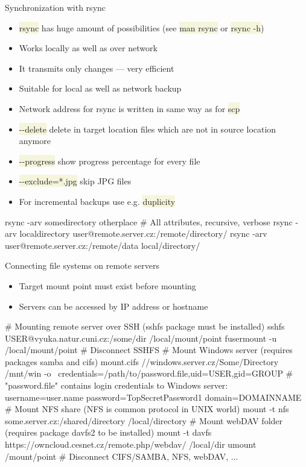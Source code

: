 \documentclass[compress, xelatex, 11pt, xcolor=svgnames, aspectratio=169, url={hyphens, lowtilde}]{beamer}
\renewcommand{\texttt}[1]{\colorbox{Beige}{{\ttfamily #1}}}
\begin{document}
\begin{frame}[fragile]{Synchronization with rsync}
	\begin{itemize}
		\item \texttt{rsync} has huge amount of possibilities (see \texttt{man rsync} or \texttt{rsync -h})
		\item Works locally as well as over network
		\item It transmits only changes --- very efficient
		\item Suitable for local as well as network backup
		\item Network address for rsync is written in same way as for \texttt{scp}
		\item \texttt{-{-}delete} delete in target location files which are not in source location anymore
		\item \texttt{-{-}progress} show progress percentage for every file
		\item \texttt{-{-}exclude=*.jpg} skip JPG files
		\item For incremental backups use e.g. \texttt{duplicity}
	\end{itemize}
	\vfill
	\begin{bashcode}
    rsync -arv somedirectory otherplace # All attributes, recursive, verbose
    rsync -arv localdirectory user@remote.server.cz:/remote/directory/
    rsync -arv user@remote.server.cz:/remote/data local/directory/
	\end{bashcode}
\end{frame}

\begin{frame}[fragile]{Connecting file systems on remote servers}
	\label{netfs}
	\begin{itemize}
		\item Target mount point must exist before mounting
		\item Servers can be accessed by IP address or hostname
	\end{itemize}
	\vfill
	\begin{bashcode}
    # Mounting remote server over SSH (sshfs package must be installed)
    sshfs USER@vyuka.natur.cuni.cz:/some/dir /local/mount/point
    fusermount -u /local/mount/point # Disconnect SSHFS
    # Mount Windows server (requires packages samba and cifs)
    mount.cifs //windows.server.cz/Some/Directory /mnt/win -o \
      credentials=/path/to/password.file,uid=USER,gid=GROUP
    # "password.file" contains login credentials to Windows server:
    username=user.name
    password=TopSecretPassword1
    domain=DOMAINNAME
    # Mount NFS share (NFS is common protocol in UNIX world)
    mount -t nfs some.server.cz:/shared/directory /local/directory
    # Mount webDAV folder (requires package davfs2 to be installed)
    mount -t davfs https://owncloud.cesnet.cz/remote.php/webdav/ /local/dir
    umount /mount/point # Disconnect CIFS/SAMBA, NFS, webDAV, ...
	\end{bashcode}
\end{frame}
\end{document}
